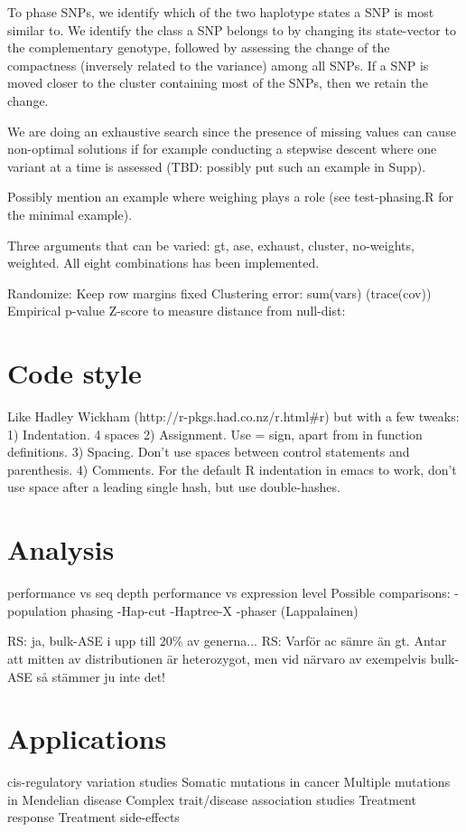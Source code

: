 To phase SNPs, we identify which of the two haplotype states a SNP is most similar to. We identify the class a SNP belongs to by changing its state-vector to the complementary genotype, followed by assessing the change of the compactness (inversely related to the variance) among all SNPs. If a SNP is moved closer to the cluster containing most of the SNPs, then we retain the change. 

We are doing an exhaustive search since the presence of missing values
can cause non-optimal solutions if for example conducting a stepwise
descent where one variant at a time is assessed (TBD: possibly put
such an example in Supp).

Possibly mention an example where weighing plays a role (see
test-phasing.R for the minimal example).

Three arguments that can be varied: {gt, ase}, {exhaust, cluster},
{no-weights, weighted}. All eight combinations has been implemented.

Randomize: Keep row margins fixed
Clustering error: sum(vars) (trace(cov))
Empirical p-value
Z-score to measure distance from null-dist: %

\section{Code style}
Like Hadley Wickham (http://r-pkgs.had.co.nz/r.html#r) but with a few tweaks:
1) Indentation. 4 spaces
2) Assignment. Use = sign, apart from in function definitions.
3) Spacing. Don't use spaces between control statements and parenthesis.
4) Comments. For the default R indentation in emacs to work, don't use space
after a leading single hash, but use double-hashes.

\section{Analysis}
performance vs seq depth
performance vs expression level
Possible comparisons: 
-population phasing
-Hap-cut
-Haptree-X
-phaser (Lappalainen)

RS: ja, bulk-ASE i upp till 20\% av generna...
RS: Varför ac sämre än gt. Antar att mitten av distributionen är heterozygot, men vid
närvaro av exempelvis bulk-ASE så stämmer ju inte det!

\section{Applications}
cis-regulatory variation studies
Somatic mutations in cancer
Multiple mutations in Mendelian disease
Complex trait/disease association studies
Treatment response
Treatment side-effects

